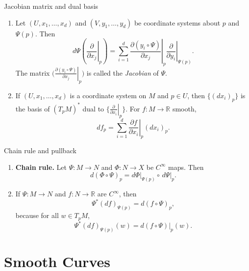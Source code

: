 \documentclass[10pt]{beamer}
\newcommand{\R}{\mathbb{R}}
\begin{document}
\begin{frame}{Jacobian matrix and dual basis}
	\begin{enumerate}
		\item[(a)] Let $(U, x_1, \dots, x_d)$ and $(V, y_1, \dots, y_d)$ be
		      coordinate systems about $p$ and $\Psi(p)$. Then
		      \[
			      d\Psi\left( \left. \frac{\partial}{\partial x_j} \right|_{p} \right)
			      = \sum_{i=1}^{d} \left. \frac{\partial (y_i \circ \Psi)}
			      {\partial x_j} \right|_{p}
			      \left. \frac{\partial}{\partial y_i} \right|_{\Psi(p)} .
		      \]
		      The matrix $\bigl( \left. \frac{\partial (y_i \circ \Psi)}
			      {\partial x_j} \right|_{p} \bigr)$ is called the
		      \emph{Jacobian} of $\Psi$.
		\item[(b)] If $(U, x_1, \dots, x_d)$ is a coordinate system on $M$
		      and $p \in U$, then $\bigl\{ (dx_i)_p \bigr\}$ is the basis of
		      $(T_p M)^*$ dual to
		      $\bigl\{ \left. \frac{\partial}{\partial x_i} \right|_{p} \bigr\}$.
		      For $f : M \to \R$ smooth,
		      \[
			      df_p = \sum_{i=1}^{d} \left. \frac{\partial f}{\partial x_i}
			      \right|_{p} (dx_i)_p .
		      \]
	\end{enumerate}
\end{frame}

\begin{frame}{Chain rule and pullback}
	\begin{enumerate}
		\item[(c)] \textbf{Chain rule.} Let $\Psi : M \to N$ and
		      $\Phi : N \to X$ be $C^\infty$ maps. Then
		      \[
			      d(\Phi \circ \Psi)_p
			      = d\Phi\big|_{\Psi(p)} \circ\, d\Psi\big|_{p} .
		      \]
		\item[(d)] If $\Psi : M \to N$ and $f : N \to \R$ are $C^\infty$,
		      then
		      \[
			      \Psi^*(df)_{\Psi(p)} = d(f \circ \Psi)_p,
		      \]
		      because for all $w \in T_p M$,
		      \[
			      \Psi^*(df)_{\Psi(p)}(w) = d(f \circ \Psi)\big|_{p}(w).
		      \]
	\end{enumerate}
\end{frame}

\section{Smooth Curves}
\end{document}
